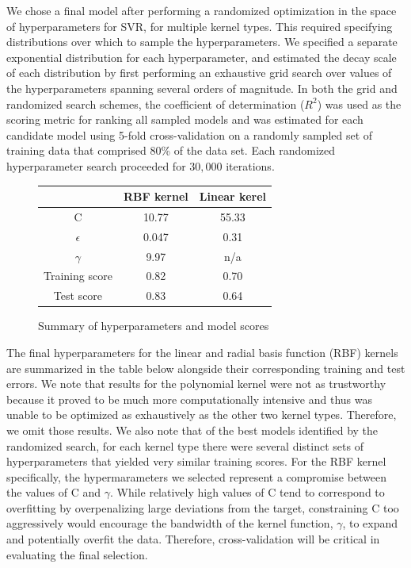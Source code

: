 \documentclass[12]{article}
\begin{document}
We chose a final model after performing a randomized optimization in the space of hyperparameters for SVR, for multiple kernel types. This required specifying distributions over which to sample the hyperparameters. We specified a separate exponential distribution for each hyperparameter, and estimated the decay scale of each distribution by first performing an exhaustive grid search over values of the hyperparameters spanning several orders of magnitude. In both the grid and randomized search schemes, the coefficient of determination ($R^2$) was used as the scoring metric for ranking all sampled models and was estimated for each candidate model using 5-fold cross-validation on a randomly sampled set of training data that comprised 80\% of the data set. Each randomized hyperparameter search proceeded for $30,000$ iterations.\\ 


\begin{figure}
\centering
\begin{tabular}{ |c|c|c| } 
 \hline
       & \textbf{RBF kernel} & \textbf{Linear kerel} \\ 
 \hline
 C              & 10.77 & 55.33 \\ 
 $\epsilon$     & 0.047 & 0.31 \\
 $\gamma$       & 9.97 & n/a \\
 Training score & 0.82 & 0.70 \\
 Test score     & 0.83 & 0.64 \\
 \hline
\end{tabular}
\caption{\label{fig:Results}Summary of hyperparameters and model scores}
\end{figure}

\noindent The final hyperparameters for the linear and radial basis function (RBF) kernels are summarized in the table below alongside their corresponding training and test errors. We note that results for the polynomial kernel were not as trustworthy because it proved to be much more computationally intensive and thus was unable to be optimized as exhaustively as the other two kernel types. Therefore, we omit those results. We also note that of the best models identified by the randomized search, for each kernel type there were several distinct sets of hyperparameters that yielded very similar training scores. For the RBF kernel specifically, the hypermarameters we selected represent a compromise between the values of C and $\gamma$. While relatively high values of C tend to correspond to overfitting by overpenalizing large deviations from the target, constraining C too aggressively would encourage the bandwidth of the kernel function, $\gamma$, to expand and potentially overfit the data. Therefore, cross-validation will be critical in evaluating the final selection.\\  
\end{document}
